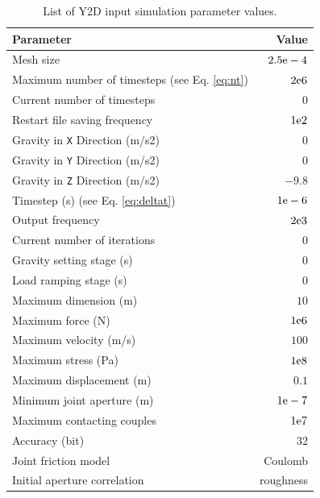 \documentclass[format=acmtog,12pt,screen=true,review=false,natbib=false,]{acmart}
\begin{document}
\begin{table}[!h]
  \caption{List of Y2D input simulation parameter values.}
  \begin{tabular*}{\columnwidth}{lr}
    Parameter                               & Value                     \\\midrule
    Mesh size                               & $2.5{\rm{e}}-4$           \\
    Maximum number of timesteps (see Eq. \ref{eq:nt})& $2{\rm{e}}6$     \\
    Current number of timesteps             & $0$                       \\
    Restart file saving frequency           & $1{\rm{e}}2$              \\
    Gravity in \texttt{X} Direction (m/s2)  & $0$                       \\
    Gravity in \texttt{Y} Direction (m/s2)  & $0$                       \\
    Gravity in \texttt{Z} Direction (m/s2)  & $-9.8$                    \\
    Timestep (s) (see Eq. \ref{eq:deltat})  & $1{\rm{e}}-6$             \\
    Output frequency                        & $2{\rm{e}}3$              \\
    Current number of iterations            & $0$                       \\
    Gravity setting stage (s)               & $0$                       \\
    Load ramping stage (s)                  & $0$                       \\
    Maximum dimension (m)                   & $10$                      \\
    Maximum force (N)                       & $1{\rm{e}}6$              \\
    Maximum velocity (m/s)                  & $100$                     \\
    Maximum stress (Pa)                     & $1{\rm{e}}8$              \\
    Maximum displacement (m)                & $0.1$                     \\
    Minimum joint aperture (m)              & $1{\rm{e}}-7$             \\
    Maximum contacting couples              & $1{\rm{e}}7$              \\
    Accuracy (bit)                          & $32$                      \\
    Joint friction model                    & Coulomb                   \\
    Initial aperture correlation            & roughness                 \\\bottomrule
  \end{tabular*}
  \label{tab:simpar}
\end{table}
\end{document}
